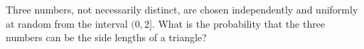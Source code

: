 Three numbers, not necessarily distinct, are chosen independently and uniformly at random from the interval $(0,2]$. What is the probability that the three numbers can be the side lengths of a triangle?
